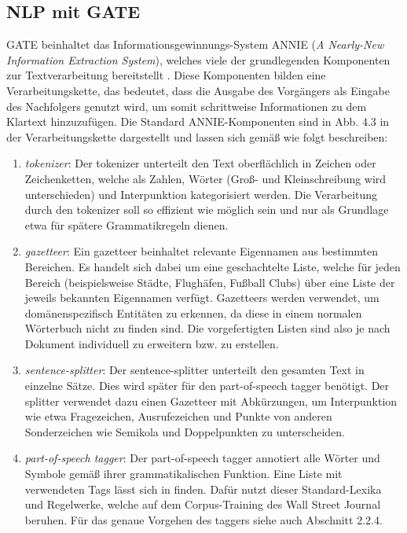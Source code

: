 \documentclass[12pt]{report}
\begin{document}
\subsection{NLP mit GATE}
GATE beinhaltet das Informationsgewinnungs-System ANNIE (\textit{A Nearly-New Information Extraction System}), welches viele der grundlegenden Komponenten zur Textverarbeitung bereitstellt \cite{go18}. Diese Komponenten bilden eine Verarbeitungskette, das bedeutet, dass die Ausgabe des Vorgängers als Eingabe des Nachfolgers genutzt wird, um somit schrittweise Informationen zu dem Klartext hinzuzufügen. Die Standard ANNIE-Komponenten sind in Abb. 4.3 in der Verarbeitungskette dargestellt und lassen sich gemäß \cite{gm18} wie folgt beschreiben:

\begin{enumerate}
\item \textit{tokenizer}: Der tokenizer unterteilt den Text oberflächlich in Zeichen oder Zeichenketten, welche als Zahlen, Wörter (Groß- und Kleinschreibung wird unterschieden) und Interpunktion kategorisiert werden. Die Verarbeitung durch den tokenizer soll so effizient wie möglich sein und nur als Grundlage etwa für spätere Grammatikregeln dienen. 

\item \textit{gazetteer}: Ein gazetteer beinhaltet relevante Eigennamen aus bestimmten Bereichen. Es handelt sich dabei um eine geschachtelte Liste, welche für jeden Bereich (beispielsweise Städte, Flughäfen, Fußball Clubs) über eine Liste der jeweils bekannten Eigennamen verfügt. Gazetteers werden verwendet, um domänenspezifisch Entitäten zu erkennen, da diese in einem normalen Wörterbuch nicht zu finden sind. Die vorgefertigten Listen sind also je nach Dokument individuell zu erweitern bzw. zu erstellen.

\item \textit{sentence-splitter}: Der sentence-splitter unterteilt den gesamten Text in einzelne Sätze. Dies wird später für den part-of-speech tagger benötigt. Der splitter verwendet dazu einen Gazetteer mit Abkürzungen, um Interpunktion wie etwa Fragezeichen, Ausrufezeichen und Punkte von anderen Sonderzeichen wie Semikola und Doppelpunkten zu unterscheiden. 

\item \textit{part-of-speech tagger}: Der part-of-speech tagger annotiert alle Wörter und Symbole gemäß ihrer grammatikalischen Funktion. Eine Liste mit verwendeten Tags lässt sich in \cite{gt18} finden. Dafür nutzt dieser Standard-Lexika und Regelwerke, welche auf dem Corpus-Training des Wall Street Journal beruhen. Für das genaue Vorgehen des taggers siehe auch Abschnitt 2.2.4.


\end{enumerate}
\end{document}
